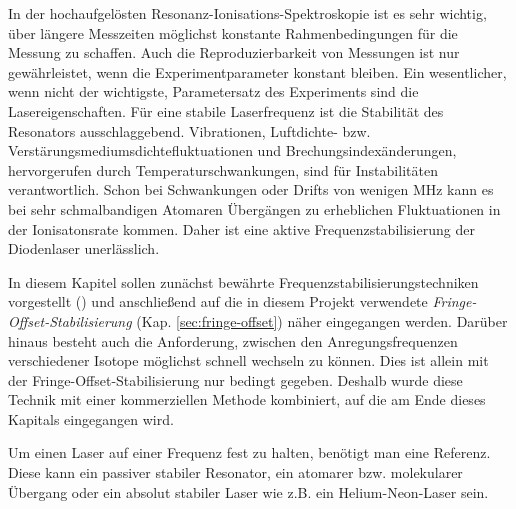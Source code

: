 In der hochaufgelösten Resonanz-Ionisations-Spektroskopie ist es
sehr wichtig, über längere Messzeiten möglichst konstante Rahmenbedingungen für die Messung zu
schaffen. Auch die Reproduzierbarkeit von Messungen ist nur gewährleistet, wenn
die Experimentparameter konstant bleiben. Ein wesentlicher, wenn nicht der
wichtigste, Parametersatz des Experiments sind die Lasereigenschaften. Für
eine stabile Laserfrequenz ist die Stabilität des Resonators ausschlaggebend.
Vibrationen, Luftdichte- bzw. Verstärungsmediumsdichtefluktuationen und
Brechungsindexänderungen, hervorgerufen durch Temperaturschwankungen, sind für
Instabilitäten verantwortlich. Schon bei Schwankungen oder Drifts von wenigen
MHz kann es bei sehr schmalbandigen Atomaren Übergängen zu erheblichen
Fluktuationen in der Ionisatonsrate kommen. Daher ist eine aktive
Frequenzstabilisierung der Diodenlaser unerlässlich.\par
In diesem Kapitel sollen zunächst bewährte Frequenzstabilisierungstechniken
vorgestellt (\cite{noertershaeuser:physik_des_lasers}) und anschließend auf die
in diesem Projekt verwendete \textit{Fringe-Offset-Stabilisierung}
(Kap. \ref{sec:fringe-offset}) näher eingegangen werden. Darüber hinaus besteht
auch die Anforderung, zwischen den Anregungsfrequenzen verschiedener Isotope möglichst schnell wechseln zu können. Dies ist allein mit der
Fringe-Offset-Stabilisierung nur bedingt gegeben. Deshalb wurde diese
Technik mit einer kommerziellen Methode kombiniert, auf die am Ende dieses
Kapitals eingegangen wird.\par
Um einen Laser auf einer Frequenz fest zu halten, benötigt man eine Referenz.
Diese kann ein passiver stabiler Resonator, ein atomarer bzw. molekularer
Übergang oder ein absolut stabiler Laser wie z.B. ein Helium-Neon-Laser sein.
